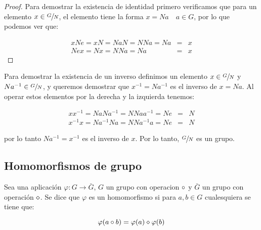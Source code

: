        \begin{proof}
            Para demostrar la existencia de identidad primero verificamos que para un elemento $x \in \sfrac{G}{N}$, el elemento tiene la forma $x = Na \quad a \in G$, por lo que podemos ver que:

            \begin{eqnarray*}
                xNe = xN = Na N = NNa = Na & = & x \\
                Nex = Nx = NNa = Na & = & x
            \end{eqnarray*}
        \end{proof}

        Para demostrar la existencia de un inverso definimos un elemento $x \in \sfrac{G}{N}$ y $Na^{-1} \in \sfrac{G}{N}$, y queremos demostrar que $x^{-1} = Na^{-1}$ es el inverso de $x = Na$. Al operar estos elementos por la derecha y la izquierda tenemos:

        \begin{eqnarray*}
            x x^{-1} = Na Na^{-1} = NNaa^{-1} = Ne & = & N \\
            x^{-1} x = Na^{-1} Na = NNa^{-1}a = Ne & = & N
        \end{eqnarray*}

        por lo tanto $Na^{-1} = x^{-1}$ es el inverso de $x$.
        Por lo tanto, $\sfrac{G}{N}$ es un grupo.


    \subsection{Homomorfismos de grupo}

        \begin{definicion}
            Sea una aplicación $\varphi \colon G \to \bar{G}$, $G$ un grupo con operacion $\circ$ y $\bar{G}$ un grupo con operación $\diamond$. Se dice que $\varphi$ es un homomorfismo si para $a, b \in G$ cualesquiera se tiene que:

            \begin{equation}
                \varphi(a \circ b) = \varphi(a) \diamond \varphi(b)
            \end{equation}
        \end{definicion}


